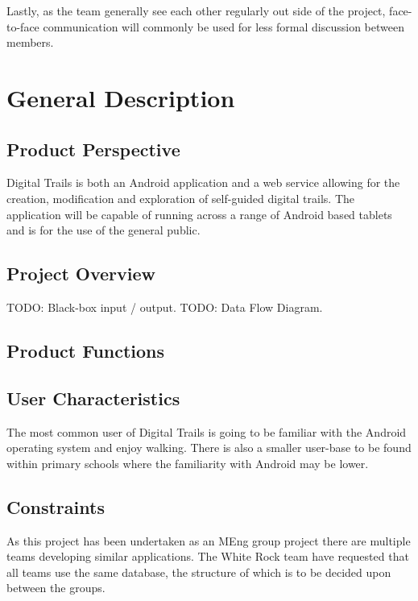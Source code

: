 \documentclass[11pt,a4paper]{article}
\begin{document}
Lastly, as the team generally see each other regularly out side of the project, face-to-face communication will commonly be used for less formal discussion between members. 

\section{General Description}
\label{sec:gen-desc}

\subsection{Product Perspective}
\label{sec:product-perspective}
Digital Trails is both an Android application and a web service allowing for the creation, modification and exploration of self-guided digital trails. The application will be capable of running across a range of Android based tablets and is for the use of the general public.

\subsection{Project Overview}
\label{sec:project-overview}
TODO: Black-box input / output.
TODO: Data Flow Diagram.

\subsection{Product Functions}
\label{sec:product-functions}


\subsection{User Characteristics}
\label{sec:user-characteristics}
The most common user of Digital Trails is going to be familiar with the Android operating system and enjoy walking. There is also a smaller user-base to be found within primary schools where the familiarity with Android may be lower.  

\subsection{Constraints}
\label{sec:constraints}
As this project has been undertaken as an MEng group project there are multiple teams developing similar applications. The White Rock team have requested that all teams use the same database, the structure of which is to be decided upon between the groups.
\end{document}
